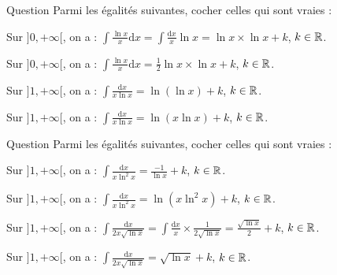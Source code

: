 \begin{multi}[multiple,feedback=
{Avec \(u=\ln x\), on aura : \(\displaystyle \mathrm{d}u=\frac{\mathrm{d}x}{x}\). D'où
\[\int \frac{\ln x}{x}\mathrm{d}x=\int u\,\mathrm{d}u=\frac{1}{2}u^2+k=\frac{1}{2}\left(\ln x\right)^2+k,\; k\in \Rr\]
et
\[\int \frac{\mathrm{d}x}{x\ln x}=\int \frac{\mathrm{d}u}{u}=\ln |u|+k=\ln (\ln x)+k,\; k\in \Rr.\]
}]{Question}
Parmi les égalités suivantes, cocher celles qui sont vraies :

    \item Sur \(]0,+\infty[\), on a : \(\displaystyle \int \frac{\ln x}{x}\mathrm{d}x=\int \frac{\mathrm{d}x}{x}\ln x=\ln x\times \ln x+k\), \(k\in \mathbb{R}\).
    \item* Sur \(]0,+\infty[\), on a : \(\displaystyle \int \frac{\ln x}{x}\mathrm{d}x=\frac{1}{2}\ln x\times \ln x+k\), \(k\in \mathbb{R}\).
    \item* Sur \(]1,+\infty[\), on a : \(\displaystyle \int \frac{\mathrm{d}x}{x\ln x}=\ln (\ln x)+k\), \(k\in \mathbb{R}\).
    \item Sur \(]1,+\infty[\), on a : \(\displaystyle \int \frac{\mathrm{d}x}{x\ln x}=\ln (x\ln x)+k\), \(k\in \mathbb{R}\).
\end{multi}


\begin{multi}[multiple,feedback=
{Avec \(u=\ln x\), on aura : \(\displaystyle \mathrm{d}u=\frac{\mathrm{d}x}{x}\). D'où
\[\int \frac{\mathrm{d}x}{x\ln ^2x}=\int \frac{\mathrm{d}u}{u^2}=\frac{-1}{u}+k=\frac{-1}{\ln x}+k,\; k\in \Rr\]
et
\[\int \frac{\mathrm{d}x}{2x\sqrt{\ln x}}=\int \frac{\mathrm{d}u}{2\sqrt{u}}=\sqrt{u}+k=\sqrt{\ln x}+k,\; k\in \Rr.\]
}]{Question}
Parmi les égalités suivantes, cocher celles qui sont vraies :

    \item* Sur \(]1,+\infty[\), on a : \(\displaystyle \int \frac{\mathrm{d}x}{x\ln ^2x}=\frac{-1}{\ln x}+k\), \(k\in \mathbb{R}\).
    \item Sur \(]1,+\infty[\), on a : \(\displaystyle \int \frac{\mathrm{d}x}{x\ln ^2x}=\ln (x\ln ^2x)+k\), \(k\in \mathbb{R}\).
    \item Sur \(]1,+\infty[\), on a : \(\displaystyle \int \frac{\mathrm{d}x}{2x\sqrt{\ln x}}=\int \frac{\mathrm{d}x}{x}\times \frac{1}{2\sqrt{\ln x}}=\frac{\sqrt{\ln x}}{2}+k\), \(k\in \mathbb{R}\).
    \item* Sur \(]1,+\infty[\), on a : \(\displaystyle \int \frac{\mathrm{d}x}{2x\sqrt{\ln x}}=\sqrt{\ln x}+k\), \(k\in \mathbb{R}\).
\end{multi}


